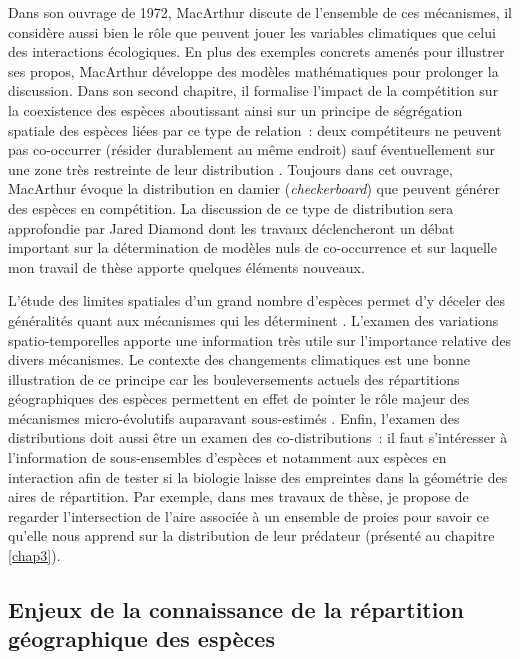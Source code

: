 Dans son ouvrage de 1972, MacArthur discute de l'ensemble de ces
mécanismes, il considère aussi bien le rôle que peuvent jouer les
variables climatiques que celui des interactions écologiques. En plus
des exemples concrets amenés pour illustrer ses propos, MacArthur
développe des modèles mathématiques pour prolonger la discussion. Dans
son second chapitre, il formalise l'impact de la compétition sur la
coexistence des espèces aboutissant ainsi sur un principe de ségrégation
spatiale des espèces liées par ce type de relation~: deux compétiteurs
ne peuvent pas co-occurrer (résider durablement au même endroit) sauf
éventuellement sur une zone très restreinte de leur distribution
\citep{macarthur1972geographical}. Toujours dans cet ouvrage, MacArthur
évoque la distribution en damier (\emph{checkerboard}) que peuvent
générer des espèces en compétition. La discussion de ce type de
distribution sera approfondie par Jared Diamond \citep{Diamond1975} dont
les travaux déclencheront un débat important sur la détermination de
modèles nuls de co-occurrence \citep{Connor1979} et sur laquelle mon
travail de thèse apporte quelques éléments nouveaux.

L'étude des limites spatiales d'un grand nombre d'espèces permet d'y
déceler des généralités quant aux mécanismes qui les déterminent
\citep{macarthur1972geographical}. L'examen des variations
spatio-temporelles apporte une information très utile sur l'importance
relative des divers mécanismes. Le contexte des changements climatiques
est une bonne illustration de ce principe car les bouleversements
actuels des répartitions géographiques des espèces permettent en effet
de pointer le rôle majeur des mécanismes micro-évolutifs auparavant
sous-estimés \citep{Lavergne2010}. Enfin, l'examen des distributions
doit aussi être un examen des co-distributions~: il faut s'intéresser à
l'information de sous-ensembles d'espèces et notamment aux espèces en
interaction afin de tester si la biologie laisse des empreintes dans la
géométrie des aires de répartition. Par exemple, dans mes travaux de
thèse, je propose de regarder l'intersection de l'aire associée à un
ensemble de proies pour savoir ce qu'elle nous apprend sur la
distribution de leur prédateur (présenté au chapitre \ref{chap3}).

\subsection*{Enjeux de la connaissance de la répartition géographique
des
espèces}\label{enjeux-de-la-connaissance-de-la-ruxe9partition-guxe9ographique-des-espuxe8ces}

